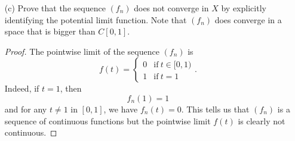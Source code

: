\documentclass[a4paper]{article}
\begin{document}
\begin{enumerate}
\begin{proof}
\begin{align*}
                                       &= \frac{ 1 }{ 2n }.
    \end{align*}
    Similarly, we have 
    \[  \int_{ 0 }^{ 1 }  {f}_{m} \ dt = \frac{ 1 }{ 2m }. \]
    So, we see that 
    \begin{align*}
        0 \leq d^{2}({f}_{n}, {f}_{m}) &\leq \int_{ 0 }^{ 1 }  {f}_{n}^{2} \ dt + \int_{ 0 }^{ 1 }  {f}_{m}^{2} \ dt = \frac{ 1 }{ 2n }  + \frac{ 1 }{ 2m }  \to 0  \ \text{as} \ n,m \to \infty.
    \end{align*}
    Via the squeeze theorem, we have \( d^{2}({f}_{n}, {f}_{m}) \to 0  \) which implies \( d({f}_{n}, {f}_{m}) \to 0  \) (since \( \phi: \R \to \R  \) defined by \( \phi(x) = x^{2} \) is continuous). Hence, we conclude that \( ({f}_{n}) \) is a Cauchy sequence in \( X  \).
        \end{proof}
    \item[(c)] Prove that the sequence \( ({f}_{n})  \) does not converge in \( X  \) by explicitly identifying the potential limit function. Note that \( ({f}_{n})  \) does converge in a space that is bigger than \( C[0,1] \).
        \begin{proof}
        The pointwise limit of the sequence \( ({f}_{n}) \) is 
        \[  f(t) = 
        \begin{cases}
            0 &\text{if} \ t \in [0,1) \\
            1 &\text{if} \ t = 1
        \end{cases}. \]
        Indeed, if \( t = 1  \), then
        \[  {f}_{n}(1) = 1  \]
        and for any \( t \neq 1  \) in \( [0,1] \), we have \( {f}_{n}(t) = 0  \). 
        This tells us that \( ({f}_{n}) \) is a sequence of continuous functions but the pointwise limit \( f(t) \) is clearly not continuous. 
        \end{proof}
\end{enumerate}
\end{document}

